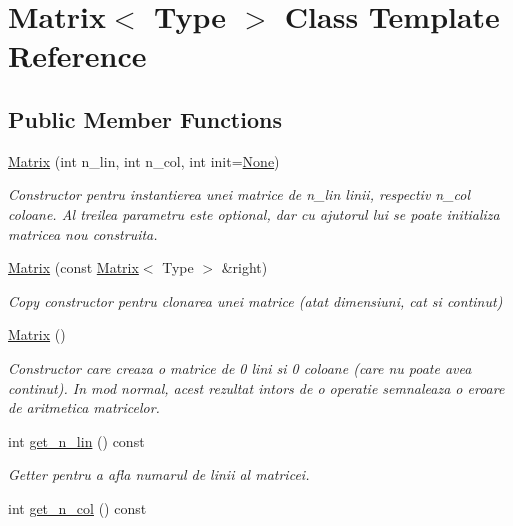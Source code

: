 \hypertarget{classMatrix}{
\section{Matrix$<$ Type $>$ Class Template Reference}
\label{classMatrix}
}
\subsection*{Public Member Functions}
\begin{DoxyCompactItemize}
\item 
\hyperlink{classMatrix_a4543e4dacf7cfa454e45f2a3d655cb99}{Matrix} (int n\_\-lin, int n\_\-col, int init=\hyperlink{classMatrix_ac576343229d4c60eb7270123baf1eb08}{None})
\begin{DoxyCompactList}\small\item\em Constructor pentru instantierea unei matrice de {\itshape n\_\-lin\/} linii, respectiv {\itshape n\_\-col\/} coloane. Al treilea parametru este optional, dar cu ajutorul lui se poate initializa matricea nou construita. \end{DoxyCompactList}\item 
\hyperlink{classMatrix_a26ec7ce757009a97599b048379466841}{Matrix} (const \hyperlink{classMatrix}{Matrix}$<$ Type $>$ \&right)
\begin{DoxyCompactList}\small\item\em Copy constructor pentru clonarea unei matrice (atat dimensiuni, cat si continut) \end{DoxyCompactList}\item 
\hypertarget{classMatrix_ae653bc04255a76bf5275bfce4aec0e5f}{
\hyperlink{classMatrix_ae653bc04255a76bf5275bfce4aec0e5f}{Matrix} ()}
\label{classMatrix_ae653bc04255a76bf5275bfce4aec0e5f}

\begin{DoxyCompactList}\small\item\em Constructor care creaza o matrice de 0 lini si 0 coloane (care nu poate avea continut). In mod normal, acest rezultat intors de o operatie semnaleaza o eroare de aritmetica matricelor. \end{DoxyCompactList}\item 
\hypertarget{classMatrix_a3f2bd634a34d187bc3f5f4b1556ae8d6}{
int \hyperlink{classMatrix_a3f2bd634a34d187bc3f5f4b1556ae8d6}{get\_\-n\_\-lin} () const }
\label{classMatrix_a3f2bd634a34d187bc3f5f4b1556ae8d6}

\begin{DoxyCompactList}\small\item\em Getter pentru a afla numarul de linii al matricei. \end{DoxyCompactList}\item 
\hypertarget{classMatrix_a7ee6511bb33eb5e1d070142b9428c7b5}{
int \hyperlink{classMatrix_a7ee6511bb33eb5e1d070142b9428c7b5}{get\_\-n\_\-col} () const }
\label{classMatrix_a7ee6511bb33eb5e1d070142b9428c7b5}


\end{DoxyCompactItemize}
